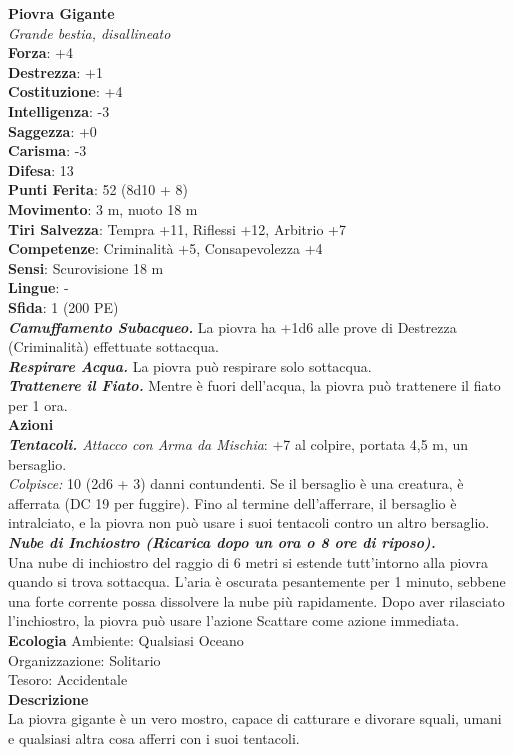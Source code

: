 \begin{multicols}{2}
\medskip\textbf{Piovra Gigante}\\
\emph{Grande bestia, disallineato}\\
\textbf{Forza}: +4\\
\textbf{Destrezza}: +1\\
\textbf{Costituzione}: +4\\
\textbf{Intelligenza}: -3\\
\textbf{Saggezza}: +0\\
\textbf{Carisma}: -3\\
\textbf{Difesa}: 13\\
\textbf{Punti Ferita}: 52 (8d10 + 8)\\
\textbf{Movimento}: 3 m, nuoto 18 m\\
\textbf{Tiri Salvezza}: Tempra +11, Riflessi +12, Arbitrio +7 \\
\textbf{Competenze}: Criminalità +5, Consapevolezza +4\\
\textbf{Sensi}: Scurovisione 18 m\\
\textbf{Lingue}: -\\
\textbf{Sfida}: 1 (200 PE)\smallskip\\
\emph{\textbf{Camuffamento Subacqueo.}} La piovra ha +1d6 alle prove di Destrezza (Criminalità) effettuate sottacqua.\\
\emph{\textbf{Respirare Acqua.}} La piovra può respirare solo sottacqua.\\
\emph{\textbf{Trattenere il Fiato.}} Mentre è fuori dell'acqua, la piovra può trattenere il fiato per 1 ora.\\
\smallskip\textbf{Azioni}\\
\emph{\textbf{Tentacoli.} Attacco con Arma da Mischia}: +7 al colpire, portata 4,5 m, un bersaglio.\\
\emph{Colpisce:} 10 (2d6 + 3) danni contundenti. Se il bersaglio è una creatura, è afferrata (DC  19 per fuggire). Fino al termine dell'afferrare, il bersaglio è intralciato, e la piovra non può usare i suoi tentacoli contro un altro bersaglio.\\
\emph{\textbf{Nube di Inchiostro (Ricarica dopo un ora o 8 ore di riposo).}}\\
Una nube di inchiostro del raggio di 6 metri si estende tutt'intorno alla piovra quando si trova sottacqua. L'aria è oscurata pesantemente per 1 minuto, sebbene una forte corrente  possa dissolvere la nube più rapidamente. Dopo aver rilasciato  l'inchiostro, la piovra può usare l'azione Scattare come azione immediata. \\
\textbf{Ecologia}
Ambiente: Qualsiasi Oceano\\
Organizzazione: Solitario\\
Tesoro: Accidentale\\
\textbf{Descrizione}\\
La piovra gigante è un vero mostro, capace di catturare e divorare squali, umani e qualsiasi altra cosa afferri con i suoi tentacoli. \\


\end{multicols}
